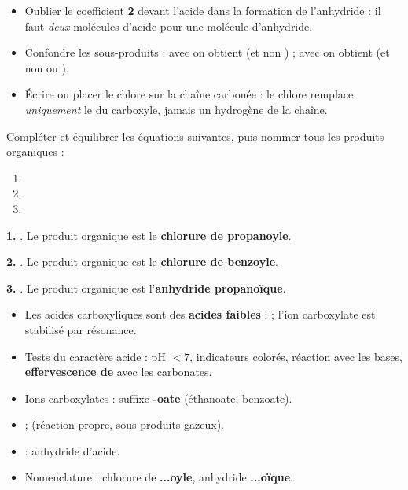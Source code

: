\documentclass[11pt]{article}
\begin{document}
\begin{attention}
\begin{itemize}
\item Oublier le coefficient \textbf{2} devant l'acide dans la formation de l'anhydride : il faut \emph{deux} molécules d'acide pour une molécule d'anhydride.
\item Confondre les sous-produits : avec  on obtient  (et non ) ; avec  on obtient  (et non  ou ).
\item Écrire  ou placer le chlore sur la chaîne carbonée : le chlore remplace \emph{uniquement} le  du carboxyle, jamais un hydrogène de la chaîne.
\end{itemize}
\end{attention}

\begin{exoresolu}
Compléter et équilibrer les équations suivantes, puis nommer tous les produits organiques :
\begin{enumerate}
\item {}
\item {}
\item {}
\end{enumerate}
\tcblower
\textbf{1.} . Le produit organique est le \textbf{chlorure de propanoyle}.

\textbf{2.} . Le produit organique est le \textbf{chlorure de benzoyle}.

\textbf{3.} . Le produit organique est l'\textbf{anhydride propanoïque}.
\end{exoresolu}

\begin{aretenir}
\begin{itemize}
\item Les acides carboxyliques sont des \textbf{acides faibles} :  ; l'ion carboxylate est stabilisé par résonance.
\item Tests du caractère acide : pH $< 7$, indicateurs colorés, réaction avec les bases, \textbf{effervescence de } avec les carbonates.
\item Ions carboxylates : suffixe \textbf{-oate} (éthanoate, benzoate).
\item {} ;  (réaction propre, sous-produits gazeux).
\item {} : anhydride d'acide.
\item Nomenclature : chlorure de \textbf{...oyle}, anhydride \textbf{...oïque}.
\end{itemize}
\end{aretenir}
\end{document}
